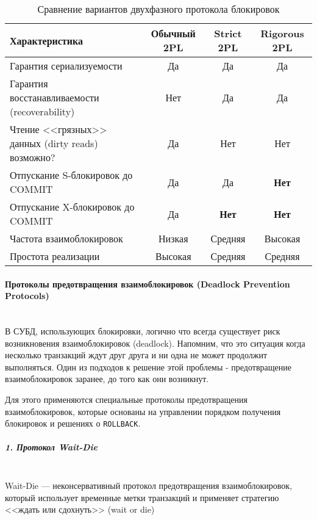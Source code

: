  \begin{table}[H]
     \centering
     \begin{tabular}{|l|c|c|c|}
         \hline
         \textbf{Характеристика} & \textbf{Обычный 2PL} & \textbf{Strict 2PL} & \textbf{Rigorous 2PL} \\
         \hline
         Гарантия сериализуемости & Да & Да & Да \\
         \hline
         Гарантия восстанавливаемости (recoverability) & Нет & Да & Да \\
         \hline
         Чтение <<грязных>> данных (dirty reads) возможно? & Да & Нет & Нет \\
         \hline
         Отпускание S-блокировок до COMMIT & Да & Да & \textbf{Нет} \\
         \hline
         Отпускание X-блокировок до COMMIT & Да & \textbf{Нет} & \textbf{Нет} \\
         \hline
         Частота взаимоблокировок & Низкая & Средняя & Высокая \\
         \hline
         Простота реализации & Высокая & Средняя & Средняя \\
         \hline
     \end{tabular}
     \caption{Сравнение вариантов двухфазного протокола блокировок}
 \end{table}
 
 \paragraph{Протоколы предотвращения взаимоблокировок (Deadlock Prevention Protocols)} ~\\
 
 В СУБД, использующих блокировки, логично что всегда существует риск возникновения взаимоблокировок (deadlock). Напомним, что это ситуация когда несколько транзакций ждут друг друга и ни одна не может продолжит выполняться. Один из подходов к решение этой проблемы - предотвращение взаимоблокировок заранее, до того как они возникнут.
 
 Для этого применяются специальные протоколы предотвращения взаимоблокировок, которые основаны на управлении порядком получения блокировок и решениях о \texttt{ROLLBACK}. \autocite{Silberschatz, ElmasriNavathe}
 
 \subparagraph{1. Протокол Wait-Die} ~\\

 Wait-Die — неконсервативный протокол предотвращения взаимоблокировок, который использует временные метки транзакций и применяет стратегию <<ждать или сдохнуть>> (wait or die)
 
